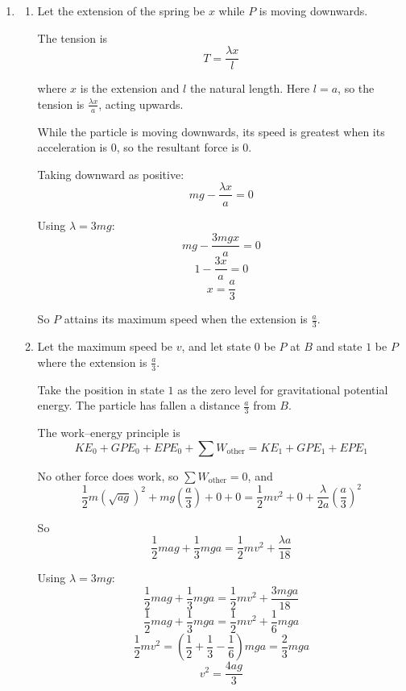 \documentclass[leqno]{article}
\begin{document}
\begin{enumerate}[
  label=\textbf{\arabic*.},
  leftmargin=*,
  topsep=0pt,
  partopsep=0pt,
  parsep=0pt
]
\begin{djsSolution}
\begin{enumerate}[label=\textbf{(\alph*)}, start=1]
Then
\[
KE_B=\frac12 m(\sqrt{ag})^2=\frac12 mag,
\qquad GPE_B=mga,
\qquad EPE_B=0
\]

and
\[
KE_C=0,
\qquad GPE_C=0,
\qquad EPE_C=\frac{\lambda a^2}{2a}=\frac{\lambda a}{2}
\]

So
\[
\frac12 mag+mga=\frac{\lambda a}{2}
\]
\[
\frac32 mga=\frac{\lambda a}{2}
\]
\[
\lambda=3mg
\]

Hence the modulus of elasticity is \(3mg\).

  \item \begin{enumerate}[label=\textbf{(\roman*)}, start=1]
    \item Let the extension of the spring be \(x\) while \(P\) is moving downwards.

The tension is
\[
T=\frac{\lambda x}{l}
\]

where \(x\) is the extension and \(l\) the natural length. Here \(l=a\), so the tension is \(\frac{\lambda x}{a}\), acting upwards.

While the particle is moving downwards, its speed is greatest when its acceleration is \(0\), so the resultant force is \(0\).

Taking downward as positive:
\[
mg-\frac{\lambda x}{a}=0
\]

Using \(\lambda=3mg\):
\[
mg-\frac{3mgx}{a}=0
\]
\[
1-\frac{3x}{a}=0
\]
\[
x=\frac{a}{3}
\]

So \(P\) attains its maximum speed when the extension is \(\frac{a}{3}\).

    \item Let the maximum speed be \(v\), and let state \(0\) be \(P\) at \(B\) and state \(1\) be \(P\) where the extension is \(\frac a3\).

Take the position in state \(1\) as the zero level for gravitational potential energy. The particle has fallen a distance \(\frac a3\) from \(B\).

The work--energy principle is
\[
KE_0+GPE_0+EPE_0+\sum W_{\text{other}}=KE_1+GPE_1+EPE_1
\]

No other force does work, so \(\sum W_{\text{other}}=0\), and
\[
\frac12 m(\sqrt{ag})^2+mg\left(\frac a3\right)+0+0
=
\frac12 mv^2+0+\frac{\lambda}{2a}\left(\frac a3\right)^2
\]

So
\[
\frac12 mag+\frac13 mga=\frac12 mv^2+\frac{\lambda a}{18}
\]

Using \(\lambda=3mg\):
\[
\frac12 mag+\frac13 mga=\frac12 mv^2+\frac{3mga}{18}
\]
\[
\frac12 mag+\frac13 mga=\frac12 mv^2+\frac16 mga
\]
\[
\frac12 mv^2=\left(\frac12+\frac13-\frac16\right)mga=\frac23 mga
\]
\[
v^2=\frac{4ag}{3}
\]


\end{enumerate}
\end{enumerate}
\end{djsSolution}
\end{enumerate}
\end{document}
